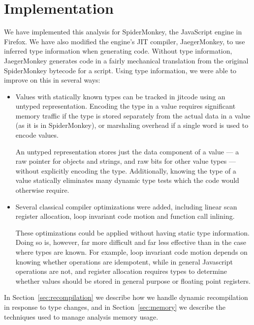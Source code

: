 
\section{Implementation}
\label{sec:implementation}

We have implemented this analysis for SpiderMonkey, the JavaScript engine
in Firefox.
We have also modified the engine's JIT compiler, JaegerMonkey, to use
inferred type information when generating code.
Without type information, JaegerMonkey generates code in a fairly mechanical
translation from the original SpiderMonkey bytecode for a script.
Using type information, we were able to improve on this in several ways:

\begin{itemize}

\item Values with statically known types can be tracked in jitcode
using an untyped representation.
Encoding the type in a value requires significant memory traffic
if the type is stored separately from the actual data in a value
(as it is in SpiderMonkey),
or marshaling overhead if a single word is used to encode values.

An untyped representation stores just the data component of a value ---
a raw pointer for objects and strings, and raw bits for other value types ---
without explicitly encoding the type.
Additionally, knowing the type of a value statically eliminates many
dynamic type tests which the code would otherwise require.

\item Several classical compiler optimizations were added,
including linear scan register allocation, loop invariant code motion
and function call inlining.

These optimizations could be applied without
having static type information.
Doing so is, however, far more difficult and far less effective than in
the case where types are known.
For example, loop invariant code motion depends on knowing whether operations
are idempotent, while in general Javascript operations are not,
and register allocation requires types to determine whether values should
be stored in general purpose or floating point registers.

\end{itemize}

In Section~\ref{sec:recompilation} we describe how we handle dynamic recompilation in
response to type changes, and in Section~\ref{sec:memory} we describe the techniques
used to manage analysis memory usage.

